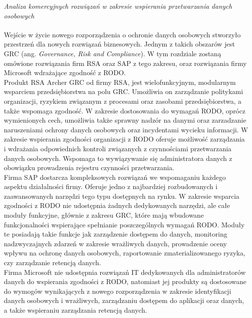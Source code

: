 \documentclass[en, noamssymb]{mgr}
\begin{document}
\indent \textit{Analiza komercyjnych rozwiązań w zakresie wspierania przetwarzania danych osobowych} \\ \\
\indent Wejście w życie nowego rozporządzenia o ochronie danych osobowych stworzyło przestrzeń dla nowych rozwiązań biznesowych. Jednym z takich obszarów jest GRC (ang. \textit{Governance, Risk and Compliance}). W tym rozdziale zostaną omówione rozwiązania firm RSA oraz SAP z tego zakresu, oraz rozwiązania firmy Microsoft wdrażające zgodność z RODO.\\
\indent Produkt RSA Archer GRC od firmy RSA, jest wielofunkcyjnym, modularnym wsparciem przedsiębiorstwa na polu GRC. Umożliwia on zarządzanie politykami organizacji, ryzykiem związanym z procesami oraz zasobami przedsiębiorstwa, a także wspomaga zgodność. W zakresie dostosowania do wymagań RODO, oprócz wymienionych cech, umożliwia także sprawny nadzór na danymi oraz zarzadzanie naruszeniami ochrony danych osobowych oraz incydentami wycieku informacji. W zakresie wspierania zgodności organizacji z RODO oferuje możliwość zarządzania i wdrażania odpowiednich kontroli związanych z czynnościami przetwarzania danych osobowych. Wspomaga to wywiązywanie się administratora danych z obowiązku prowadzenia rejestru czynności przetwarzania.\\
\indent Firma SAP dostarcza kompleksowych rozwiązań we wspomaganiu każdego aspektu działalności firmy. Oferuje jedno z najbardziej rozbudowanych i zaawansowanych narzędzi tego typu dostępnych na rynku. W zakresie wsparcia zgodności z RODO nie udostępnia żadnych dedykowanych narzędzi, ale całe moduły funkcyjne, głównie z zakresu GRC, które mają wbudowane funkcjonalności wspierające spełnianie poszczególnych wymagań RODO. Moduły te posiadają takie funkcje jak zarządzenie dostępem do danych, monitoring nadzwyczajnych zdarzeń w zakresie wrażliwych danych, prowadzenie oceny wpływu na ochronę danych osobowych, raportowanie zmaterializowanego ryzyka, czy zarządzanie retencją danych.\\
\indent Firma Microsoft nie udostępnia rozwiązań IT dedykowanych dla administratorów danych do wspierania zgodności z RODO, natomiast jej produkty są dostosowane do wymogów wynikających z nowego rozporządzenia w zakresie  identyfikacji danych osobowych i wrażliwych, zarządzaniu dostępem do aplikacji oraz danych, a także wspieraniu zarządzania retencją danych.\\ \\
\end{document}
